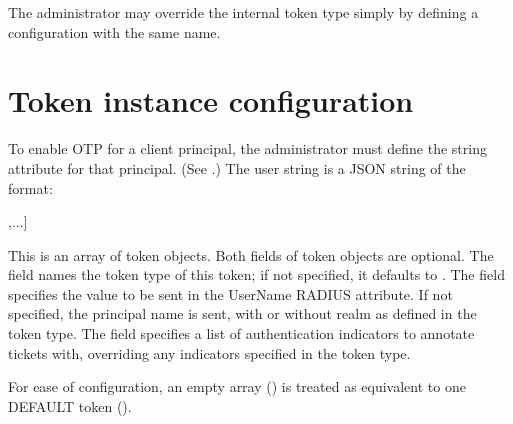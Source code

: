\documentclass[letterpaper,10pt,english]{sphinxmanual}
\begin{document}
\begin{sphinxVerbatim}[commandchars=\\\{\}]
\PYG{p}{[}\PYG{p}{]}
      
          
\end{sphinxVerbatim}

\sphinxAtStartPar
The administrator may override the internal  token type
simply by defining a configuration with the same name.


\section{Token instance configuration}
\label{\detokenize{admin/otp:token-instance-configuration}}
\sphinxAtStartPar
To enable OTP for a client principal, the administrator must define
the  string attribute for that principal.  (See
{\hyperref[\detokenize{admin/admin_commands/kadmin_local:set-string}]{}}.)  The  user string is a JSON string of the
format:

\begin{sphinxVerbatim}[commandchars=\\\{\}]
[\PYGZob{}
\PYG{+w}{    }\PYGZdq{}type\PYGZdq{}:\PYG{+w}{ }\PYG{n+nt}{\PYGZlt{}string}\PYG{n+nt}{\PYGZgt{}},
\PYG{+w}{    }\PYGZdq{}username\PYGZdq{}:\PYG{+w}{ }\PYG{n+nt}{\PYGZlt{}string}\PYG{n+nt}{\PYGZgt{}},
\PYG{+w}{    }\PYGZdq{}indicators\PYGZdq{}:\PYG{+w}{ }[\PYG{n+nt}{\PYGZlt{}string}\PYG{n+nt}{\PYGZgt{}},\PYG{+w}{ }...]
\PYGZcb{},...]
\end{sphinxVerbatim}

\sphinxAtStartPar
This is an array of token objects.  Both fields of token objects are
optional.  The  field names the token type of this token; if
not specified, it defaults to .  The  field
specifies the value to be sent in the User\sphinxhyphen{}Name RADIUS attribute.  If
not specified, the principal name is sent, with or without realm as
defined in the token type.  The  field specifies a list
of authentication indicators to annotate tickets with, overriding any
indicators specified in the token type.

\sphinxAtStartPar
For ease of configuration, an empty array (\sphinxcode{\sphinxupquote{{[}{]}}}) is treated as
equivalent to one DEFAULT token (\sphinxcode{\sphinxupquote{{[}\{\}{]}}}).
\end{document}
